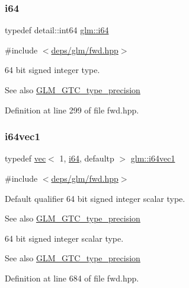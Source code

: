 \subsubsection{\texorpdfstring{i64}{i64}}
{\footnotesize\ttfamily typedef detail\+::int64 \hyperlink{group__gtc__type__precision_gac7a7eaad46064fc952b06df33689da23}{glm\+::i64}}



{\ttfamily \#include $<$\hyperlink{fwd_8hpp}{deps/glm/fwd.\+hpp}$>$}

64 bit signed integer type. \begin{DoxySeeAlso}{See also}
\hyperlink{group__gtc__type__precision}{G\+L\+M\+\_\+\+G\+T\+C\+\_\+type\+\_\+precision} 
\end{DoxySeeAlso}


Definition at line 299 of file fwd.\+hpp.

\mbox{\label{group__gtc__type__precision_gad2bbfb4ed2d4b1e1551c721f81739e49}} 
\subsubsection{\texorpdfstring{i64vec1}{i64vec1}}
{\footnotesize\ttfamily typedef \hyperlink{structglm_1_1vec}{vec}$<$ 1, \hyperlink{group__gtc__type__precision_gac7a7eaad46064fc952b06df33689da23}{i64}, defaultp $>$ \hyperlink{group__gtc__type__precision_gad2bbfb4ed2d4b1e1551c721f81739e49}{glm\+::i64vec1}}



{\ttfamily \#include $<$\hyperlink{fwd_8hpp}{deps/glm/fwd.\+hpp}$>$}

Default qualifier 64 bit signed integer scalar type. \begin{DoxySeeAlso}{See also}
\hyperlink{group__gtc__type__precision}{G\+L\+M\+\_\+\+G\+T\+C\+\_\+type\+\_\+precision}
\end{DoxySeeAlso}
64 bit signed integer scalar type. \begin{DoxySeeAlso}{See also}
\hyperlink{group__gtc__type__precision}{G\+L\+M\+\_\+\+G\+T\+C\+\_\+type\+\_\+precision} 
\end{DoxySeeAlso}


Definition at line 684 of file fwd.\+hpp.

